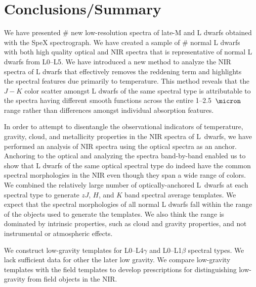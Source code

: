 \documentclass[12pt,preprint]{aastex}
\begin{document}
								   
								    
\clearpage 
\section{Conclusions/Summary}
\label{sec:summary}

We have presented \# new low-resolution spectra of late-M and L dwarfs obtained with the SpeX spectrograph.
We have created a sample of \# normal L dwarfs with both high quality optical and NIR spectra that is representative of normal L dwarfs from L0--L5.
We have introduced a new method to analyze the NIR spectra of L dwarfs that effectively removes the reddening term and highlights the spectral features due primarily to temperature. 
This method reveals that the $J-K$ color scatter amongst L dwarfs of the same spectral type is attributable to the spectra having different smooth functions across the entire 1--2.5~$\micron$ range rather than differences amongst individual absorption features.

In order to attempt to disentangle the observational indicators of temperature, gravity, cloud, and metallicity properties in the NIR spectra of L~dwarfs, we have performed an analysis of NIR spectra using the optical spectra as an anchor.
Anchoring to the optical and analyzing the spectra band-by-band enabled us to show that L dwarfs of the same optical spectral type do indeed have the common spectral morphologies in the NIR even though they span a wide range of colors.
We combined the relatively large number of optically-anchored L~dwarfs at each spectral type to generate $zJ$, $H$, and $K$ band spectral average templates. 
We expect that the spectral morphologies of all normal L dwarfs fall within the range of the objects used to generate the templates. 
We also think the range is dominated by intrinsic properties, such as cloud and gravity properties, and not instrumental or atmospheric effects.

We construct low-gravity templates for L0--L4$\gamma$ and L0--L1$\beta$ spectral types. 
We lack sufficient data for other the later low gravity. 
We compare low-gravity templates with the field templates to develop prescriptions for distinguishing low-gravity from field objects in the NIR.
\end{document}
